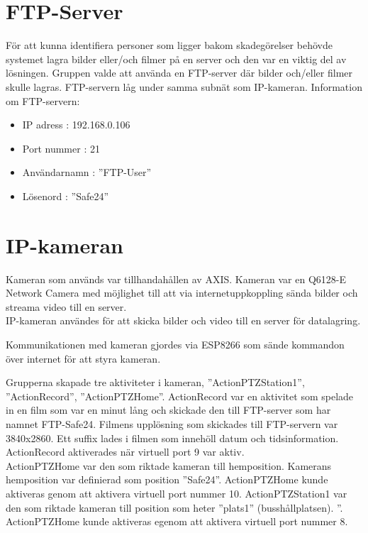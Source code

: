 \section{FTP-Server}
För att kunna identifiera personer som ligger bakom skadegörelser behövde systemet lagra bilder eller/och filmer på en server och den var en viktig del av lösningen. Gruppen valde att använda en FTP-server där bilder och/eller filmer skulle lagras. FTP-servern låg under samma subnät som IP-kameran. Information om FTP-servern:

\begin{itemize}
\item IP adress : 192.168.0.106

\item Port nummer : 21

\item Användarnamn : ”FTP-User”

\item Lösenord : ”Safe24”

\end{itemize}
\section{IP-kameran}
Kameran som används var tillhandahållen av AXIS. Kameran var en Q6128-E Network Camera med möjlighet till att via  internetuppkoppling sända bilder och streama video till en server.\\

IP-kameran användes för att skicka bilder och video till en server för datalagring.

Kommunikationen med kameran gjordes via ESP8266 som sände kommandon över internet för att styra kameran.

Grupperna skapade tre aktiviteter i kameran, ”ActionPTZStation1”, ”ActionRecord”, ”ActionPTZHome”.
ActionRecord var en aktivitet som spelade in en film som var en minut lång och skickade den till FTP-server som har namnet FTP-Safe24. Filmens upplösning som skickades till FTP-servern var 3840x2860. Ett suffix lades i filmen som innehöll datum och tidsinformation. ActionRecord aktiverades när virtuell port 9 var aktiv.\\
ActionPTZHome var den som riktade kameran till hemposition. Kamerans hemposition var definierad som position ”Safe24”. ActionPTZHome kunde aktiveras genom att aktivera virtuell port nummer 10.
ActionPTZStation1 var den som riktade kameran till position som heter ”plats1” (busshållplatsen). ”. ActionPTZHome kunde aktiveras egenom att aktivera virtuell port nummer 8.


